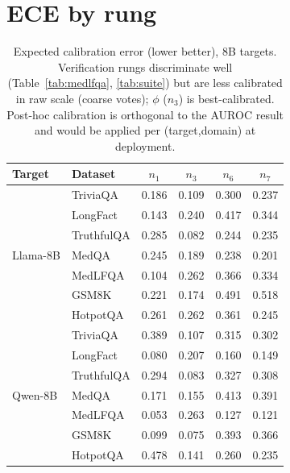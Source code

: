 \documentclass[11pt]{article}
\newcommand{\nverb}{$n_1$}     %
\newcommand{\nphi}{$n_3$}      %
\newcommand{\nyn}{$n_6$}       %
\newcommand{\nsc}{$n_7$}       %
\begin{document}
\section{ECE by rung}\label{app:ece}
\begin{table}[h]
\centering\small
\begin{tabular}{llcccc}
\toprule
Target & Dataset & \nverb & \nphi & \nyn & \nsc \\
\midrule
\multirow{7}{*}{Llama-8B}
 & TriviaQA   & 0.186 & 0.109 & 0.300 & 0.237 \\
 & LongFact   & 0.143 & 0.240 & 0.417 & 0.344 \\
 & TruthfulQA & 0.285 & 0.082 & 0.244 & 0.235 \\
 & MedQA      & 0.245 & 0.189 & 0.238 & 0.201 \\
 & MedLFQA    & 0.104 & 0.262 & 0.366 & 0.334 \\
 & GSM8K      & 0.221 & 0.174 & 0.491 & 0.518 \\
 & HotpotQA   & 0.261 & 0.262 & 0.361 & 0.245 \\
\midrule
\multirow{7}{*}{Qwen-8B}
 & TriviaQA   & 0.389 & 0.107 & 0.315 & 0.302 \\
 & LongFact   & 0.080 & 0.207 & 0.160 & 0.149 \\
 & TruthfulQA & 0.294 & 0.083 & 0.327 & 0.308 \\
 & MedQA      & 0.171 & 0.155 & 0.413 & 0.391 \\
 & MedLFQA    & 0.053 & 0.263 & 0.127 & 0.121 \\
 & GSM8K      & 0.099 & 0.075 & 0.393 & 0.366 \\
 & HotpotQA   & 0.478 & 0.141 & 0.260 & 0.235 \\
\bottomrule
\end{tabular}
\caption{Expected calibration error (lower better), 8B targets. Verification rungs
discriminate well (Table~\ref{tab:medlfqa}, \ref{tab:suite}) but are less calibrated in raw
scale (coarse votes); $\phi$ ($n_3$) is best-calibrated. Post-hoc calibration is orthogonal to
the AUROC result and would be applied per (target,domain) at deployment.}
\label{tab:ece}
\end{table}
\end{document}
